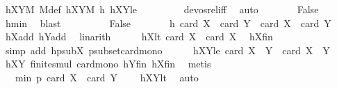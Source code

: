 \begin{isabellebody}
\ hXYM\ M{\isacharunderscore}{\kern0pt}def\ hXY{}M\ h\ hXY{}le\ \isanewline
\ \ \ \ \ \ \ \ devos{\isacharunderscore}{\kern0pt}rel{\isacharunderscore}{\kern0pt}iff\ \isamarkupfalse%
\ auto\isanewline
\ \ \ \ \isamarkupfalse%
\ \isamarkupfalse%
\ False\ \isamarkupfalse%
\ hmin\ \isamarkupfalse%
\ blast\ \isanewline
\ \ \isamarkupfalse%
\isanewline
\ \ \ \ \isamarkupfalse%
\ False\isanewline
\ \ \ \ \isamarkupfalse%
\ \isamarkupfalse%
\ h{\isacharcolon}{\kern0pt}\ {\isachardoublequoteopen}card\ {\isacharquery}{\kern0pt}X{}\ {\isacharplus}{\kern0pt}\ card\ {\isacharquery}{\kern0pt}Y{}\ {\isasymge}\ card\ X\ {\isacharplus}{\kern0pt}\ card\ Y{\isachardoublequoteclose}\ \isamarkupfalse%
\ hXadd\ hYadd\ \isamarkupfalse%
\ linarith\isanewline
\ \ \ \ \isamarkupfalse%
\ hX{}lt{\isacharcolon}{\kern0pt}\ {\isachardoublequoteopen}card\ {\isacharquery}{\kern0pt}X{}\ {\isacharless}{\kern0pt}\ card\ X{\isachardoublequoteclose}\ \isamarkupfalse%
\ hXfin\ \isamarkupfalse%
\ {\isacharparenleft}{\kern0pt}simp\ add{\isacharcolon}{\kern0pt}\ hpsubX\ psubset{\isacharunderscore}{\kern0pt}card{\isacharunderscore}{\kern0pt}mono{\isacharparenright}{\kern0pt}\isanewline
\ \ \ \ \isamarkupfalse%
\ hXY{}le{\isacharcolon}{\kern0pt}\ {\isachardoublequoteopen}card\ {\isacharparenleft}{\kern0pt}{\isacharquery}{\kern0pt}X{}\ {\isasymcdots}\ {\isacharquery}{\kern0pt}Y{}{\isacharparenright}{\kern0pt}\ {\isasymle}\ card\ {\isacharparenleft}{\kern0pt}X\ {\isasymcdots}\ Y{\isacharparenright}{\kern0pt}{\isachardoublequoteclose}\ \isamarkupfalse%
\ hXY{}\ finite{\isacharunderscore}{\kern0pt}smul\ card{\isacharunderscore}{\kern0pt}mono\ hYfin\ hXfin\ \isamarkupfalse%
\ metis\isanewline
\ \ \ \ \isamarkupfalse%
\ \isamarkupfalse%
\ {\isachardoublequoteopen}{\isachardot}{\kern0pt}{\isachardot}{\kern0pt}{\isachardot}{\kern0pt}\ {\isacharless}{\kern0pt}\ min\ p\ {\isacharparenleft}{\kern0pt}card\ X\ {\isacharplus}{\kern0pt}\ card\ Y\ {\isacharminus}{\kern0pt}\ {}{\isacharparenright}{\kern0pt}{\isachardoublequoteclose}\ \isamarkupfalse%
\ hXYlt\ \isamarkupfalse%
\ auto\isanewline
\ \ \ \ \isamarkupfalse%

\end{isabellebody}
